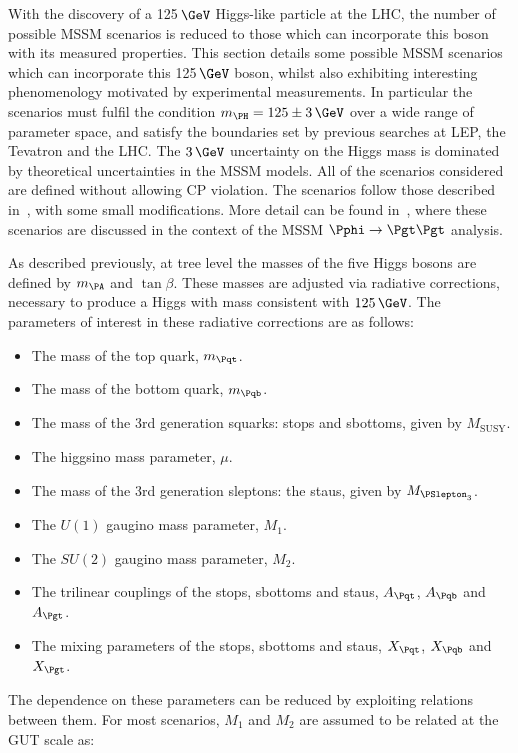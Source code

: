 With the discovery of a 125$\,\GeV$ Higgs-like particle at the LHC, the number of
possible \ac{MSSM} scenarios is reduced to those which can incorporate this boson
with its measured properties. This section details some possible \ac{MSSM} scenarios
which can incorporate this 125$\,\GeV$ boson, whilst also exhibiting interesting
phenomenology motivated by experimental measurements. In particular the
scenarios must fulfil the condition $m_{\PH} = 125 \pm 3\,\GeV$ over a wide range
of parameter space, and satisfy the boundaries set by previous searches at LEP,
the Tevatron and the LHC. The $3\,\GeV$ uncertainty on the Higgs mass is
dominated by theoretical uncertainties in the \ac{MSSM} models. All of the scenarios 
considered are defined without allowing CP violation. The scenarios follow those
described in~\cite{MSSMScenarios}, with some small modifications. More detail
can be found in~\cite{HIG-13-021}, where these scenarios are discussed in the context
of the \ac{MSSM} $\Pphi \to \Pgt\Pgt$ analysis. 

As described previously, at tree level the masses of the five Higgs bosons are
defined by $m_{\PA}$ and $\tan\beta$. These masses are adjusted via radiative
corrections, necessary to produce a Higgs with mass consistent with $125\,\GeV$.
The parameters of interest in these radiative corrections are as follows:

\begin{itemize}
\item The mass of the top quark, $m_{\Pqt}$.
\item The mass of the bottom quark, $m_{\Pqb}$.
\item The mass of the 3rd generation squarks: stops and sbottoms, given by
$M_{\text{SUSY}}$.
\item The higgsino mass parameter, $\mu$.
\item The mass of the 3rd generation sleptons: the staus, given by
$M_{\PSlepton_{3}}$.
\item The $U(1)$ gaugino mass parameter, $M_{1}$.
\item The $SU(2)$ gaugino mass parameter, $M_{2}$.
\item The trilinear couplings of the stops, sbottoms and staus, $A_{\Pqt}$,
$A_{\Pqb}$ and $A_{\Pgt}$.
\item The mixing parameters of the stops, sbottoms and staus, $X_{\Pqt}$,
$X_{\Pqb}$ and $X_{\Pgt}$.
\end{itemize}

The dependence on these parameters can be reduced by exploiting relations
between them. For most scenarios, $M_{1}$ and $M_{2}$ are assumed to be related
at the GUT scale as:

